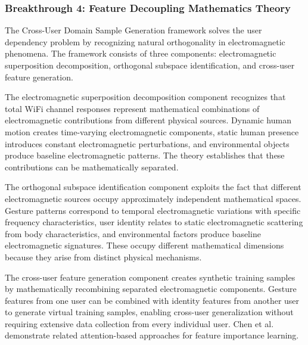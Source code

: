 \documentclass[journal]{IEEEtran}
\begin{document}
\subsubsection{Breakthrough 4: Feature Decoupling Mathematics Theory}

The Cross-User Domain Sample Generation framework \cite{wang2024feature} solves the user dependency problem by recognizing natural orthogonality in electromagnetic phenomena. The framework consists of three components: electromagnetic superposition decomposition, orthogonal subspace identification, and cross-user feature generation.

The electromagnetic superposition decomposition component recognizes that total WiFi channel responses represent mathematical combinations of electromagnetic contributions from different physical sources. Dynamic human motion creates time-varying electromagnetic components, static human presence introduces constant electromagnetic perturbations, and environmental objects produce baseline electromagnetic patterns. The theory establishes that these contributions can be mathematically separated.

The orthogonal subspace identification component exploits the fact that different electromagnetic sources occupy approximately independent mathematical spaces. Gesture patterns correspond to temporal electromagnetic variations with specific frequency characteristics, user identity relates to static electromagnetic scattering from body characteristics, and environmental factors produce baseline electromagnetic signatures. These occupy different mathematical dimensions because they arise from distinct physical mechanisms.

The cross-user feature generation component creates synthetic training samples by mathematically recombining separated electromagnetic components. Gesture features from one user can be combined with identity features from another user to generate virtual training samples, enabling cross-user generalization without requiring extensive data collection from every individual user. Chen et al. \cite{chen2018wifi} demonstrate related attention-based approaches for feature importance learning.
\end{document}
